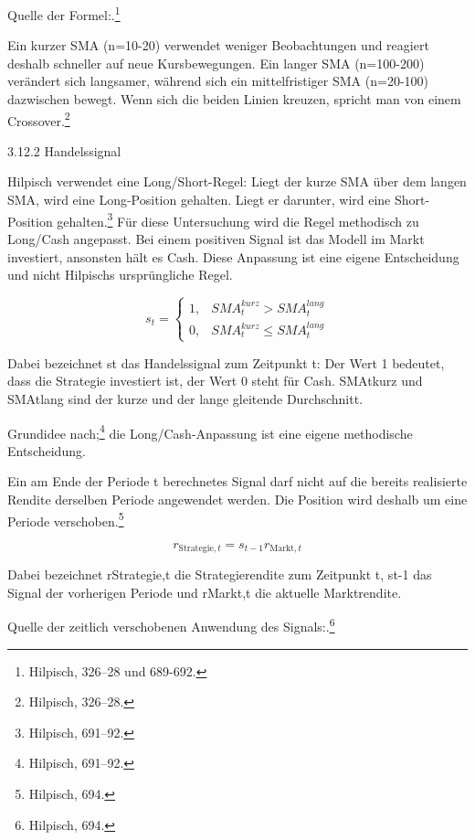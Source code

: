 \documentclass[
  ngerman,
  a4paper,
  DIV=11,
  oneside]{scrreprt}
\begin{document}
Quelle der Formel:.\footnote{Hilpisch, 326--28 und 689-692.}

Ein kurzer SMA (n=10-20) verwendet weniger Beobachtungen und reagiert
deshalb schneller auf neue Kursbewegungen. Ein langer SMA (n=100-200)
verändert sich langsamer, während sich ein mittelfristiger SMA
(n=20-100) dazwischen bewegt. Wenn sich die beiden Linien kreuzen,
spricht man von einem Crossover.\footnote{Hilpisch, 326--28.}

3.12.2 Handelssignal

Hilpisch verwendet eine Long/Short-Regel: Liegt der kurze SMA über dem
langen SMA, wird eine Long-Position gehalten. Liegt er darunter, wird
eine Short-Position gehalten.\footnote{Hilpisch, 691--92.} Für diese
Untersuchung wird die Regel methodisch zu Long/Cash angepasst. Bei einem
positiven Signal ist das Modell im Markt investiert, ansonsten hält es
Cash. Diese Anpassung ist eine eigene Entscheidung und nicht Hilpischs
ursprüngliche Regel.

\[
s_t=\begin{cases}1,&SMA_t^{kurz}>SMA_t^{lang}\\0,&SMA_t^{kurz}\leq SMA_t^{lang}\end{cases}
\]

Dabei bezeichnet st das Handelssignal zum Zeitpunkt t: Der Wert 1
bedeutet, dass die Strategie investiert ist, der Wert 0 steht für Cash.
SMAtkurz und SMAtlang sind der kurze und der lange gleitende
Durchschnitt.

Grundidee nach;\footnote{Hilpisch, 691--92.} die Long/Cash-Anpassung ist
eine eigene methodische Entscheidung.

Ein am Ende der Periode t berechnetes Signal darf nicht auf die bereits
realisierte Rendite derselben Periode angewendet werden. Die Position
wird deshalb um eine Periode verschoben.\footnote{Hilpisch, 694.}

\[
r_{\mathrm{Strategie},t}=s_{t-1}r_{\mathrm{Markt},t}
\]

Dabei bezeichnet rStrategie,t die Strategierendite zum Zeitpunkt t, st-1
das Signal der vorherigen Periode und rMarkt,t die aktuelle
Marktrendite.

Quelle der zeitlich verschobenen Anwendung des Signals:.\footnote{Hilpisch,
  694.}
\end{document}
